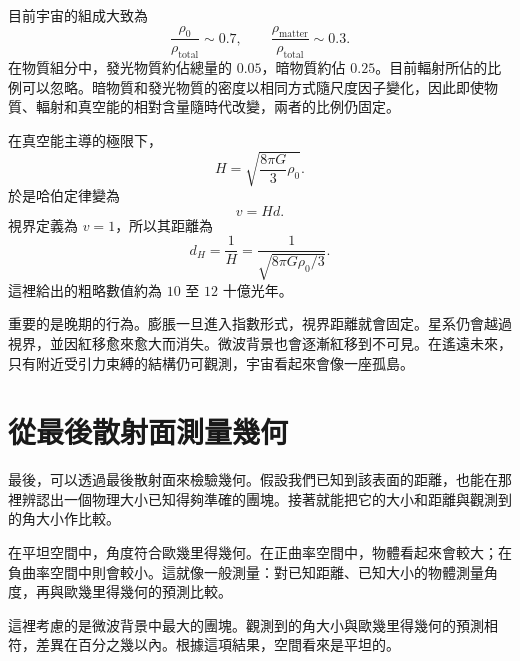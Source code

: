 \begin{classroomqa}
\end{classroomqa}

目前宇宙的組成大致為
\begin{equation}
\frac{\rho_0}{\rho_{\text{total}}}\sim 0.7,
\qquad
\frac{\rho_{\text{matter}}}{\rho_{\text{total}}}\sim 0.3.
\end{equation}
在物質組分中，發光物質約佔總量的 \(0.05\)，暗物質約佔 \(0.25\)。目前輻射所佔的比例可以忽略。暗物質和發光物質的密度以相同方式隨尺度因子變化，因此即使物質、輻射和真空能的相對含量隨時代改變，兩者的比例仍固定。

在真空能主導的極限下，
\begin{equation}
H=\sqrt{\frac{8\pi G}{3}\rho_0}.
\end{equation}
於是哈伯定律變為
\begin{equation}
v=Hd.
\end{equation}
視界定義為 \(v=1\)，所以其距離為
\begin{equation}
d_H=\frac{1}{H}
=
\frac{1}{\sqrt{8\pi G\rho_0/3}}.
\end{equation}
這裡給出的粗略數值約為 \(10\) 至 \(12\) 十億光年。

重要的是晚期的行為。膨脹一旦進入指數形式，視界距離就會固定。星系仍會越過視界，並因紅移愈來愈大而消失。微波背景也會逐漸紅移到不可見。在遙遠未來，只有附近受引力束縛的結構仍可觀測，宇宙看起來會像一座孤島。

\section{從最後散射面測量幾何}

最後，可以透過最後散射面來檢驗幾何。假設我們已知到該表面的距離，也能在那裡辨認出一個物理大小已知得夠準確的團塊。接著就能把它的大小和距離與觀測到的角大小作比較。

在平坦空間中，角度符合歐幾里得幾何。在正曲率空間中，物體看起來會較大；在負曲率空間中則會較小。這就像一般測量：對已知距離、已知大小的物體測量角度，再與歐幾里得幾何的預測比較。

\begin{classroomqa}
\end{classroomqa}

這裡考慮的是微波背景中最大的團塊。觀測到的角大小與歐幾里得幾何的預測相符，差異在百分之幾以內。根據這項結果，空間看來是平坦的。

